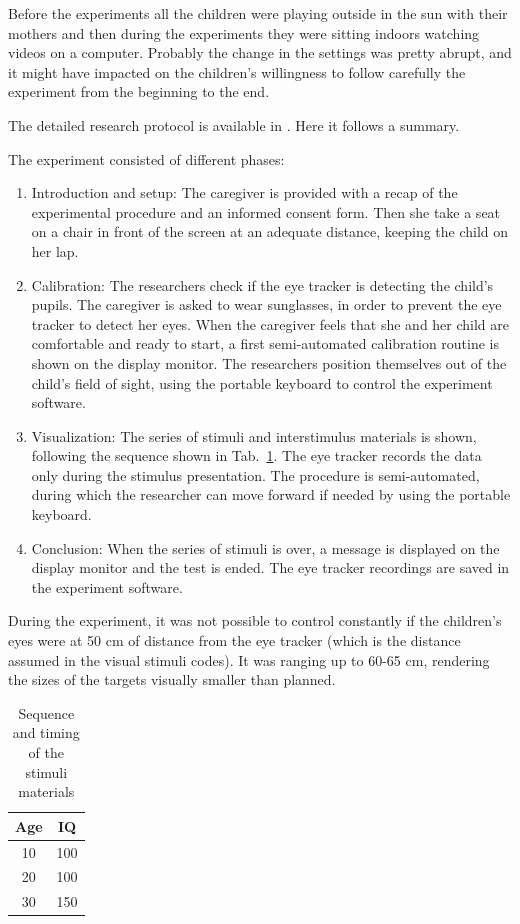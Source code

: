 Before the experiments all the children were playing outside in the sun with their mothers and then during the experiments they were sitting indoors watching videos on a computer. Probably the change in the settings was pretty abrupt, and it might have impacted on the children’s willingness to follow carefully the experiment from the beginning to the end.

The detailed research protocol is available in . Here it follows a summary.

The experiment consisted of different phases:
\begin{enumerate}
    \item Introduction and setup: The caregiver is provided with a recap of the experimental procedure and an informed consent form. Then she take a seat on a chair in front of the screen at an adequate distance, keeping the child on her lap.
    \item Calibration: The researchers check if the eye tracker is detecting the child’s pupils. The caregiver is asked to wear sunglasses, in order to prevent the eye tracker to detect her eyes. When the caregiver feels that she and her child are comfortable and ready to start, a first semi-automated calibration routine is shown on the display monitor. The researchers position themselves out of the child’s field of sight, using the portable keyboard to control the experiment software.
    \item Visualization: The series of stimuli and interstimulus materials is shown, following the sequence shown in Tab.~\ref{tab:stimulisuccession}. The eye tracker records the data only during the stimulus presentation. The procedure is semi-automated, during which the researcher can move forward if needed by using the portable keyboard.
    \item Conclusion: When the series of stimuli is over, a message is displayed on the display monitor and the test is ended. The eye tracker recordings are saved in the experiment software.
\end{enumerate}

During the experiment, it was not possible to control constantly if the children’s eyes were at 50 cm of distance from the eye tracker (which is the distance assumed in the visual stimuli codes). It was ranging up to 60-65 cm, rendering the sizes of the targets visually smaller than planned.

\begin{table}[h]
  \centering
  \begin{tabular}{c|c}
    Age  & IQ  \\ 
    \hline
    10   & 100 \\
    20   & 100 \\
    30   & 150
  \end{tabular}
  \caption{Sequence and timing of the stimuli materials}
  \label{tab:stimulisuccession}
\end{table}

